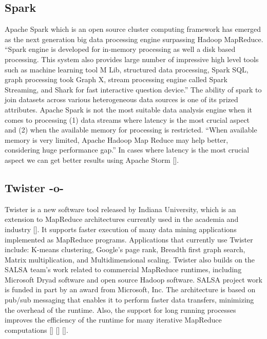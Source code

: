 \subsection{Spark}

Apache Spark which is an open source cluster computing framework has
emerged as the next generation big data processing engine surpassing
Hadoop MapReduce. ``Spark engine is developed for in-memory processing
as well a disk based processing. This system also provides large
number of impressive high level tools such as machine learning tool M
Lib, structured data processing, Spark SQL, graph processing took
Graph X, stream processing engine called Spark Streaming, and Shark
for fast interactive question device.'' The ability of spark to join
datasets across various heterogeneous data sources is one of its
prized attributes. Apache Spark is not the most suitable data analysis
engine when it comes to processing (1) data streams where latency is
the most crucial aspect and (2) when the available memory for
processing is restricted. ``When available memory is very limited,
Apache Hadoop Map Reduce may help better, considering huge performance
gap.'' In cases where latency is the most crucial aspect we can get
better results using Apache Storm [\cite{www-spark}].
     
\subsection{Twister -o-}

Twister is a new software tool released by Indiana University, which
is an extension to MapReduce architectures currently used in the
academia and industry [\cite{www-twister1}]. It supports faster
execution of many data mining applications implemented as MapReduce
programs. Applications that currently use Twister include: K-means
clustering, Google's page rank, Breadth first graph search, Matrix
multiplication, and Multidimensional scaling. Twister also builds on
the SALSA team's work related to commercial MapReduce runtimes,
including Microsoft Dryad software and open source Hadoop
software. SALSA project work is funded in part by an award from
Microsoft, Inc. The architecture is based on pub/sub messaging that
enables it to perform faster data transfers, minimizing the overhead
of the runtime. Also, the support for long running processes improves
the efficiency of the runtime for many iterative MapReduce
computations [\cite{www-twister2}] [\cite{www-twister3}] [\cite{paper-twister}].



